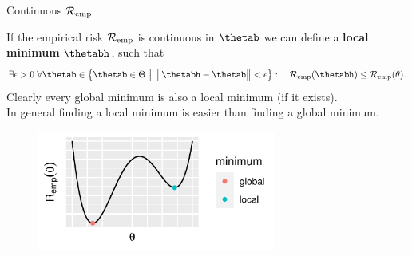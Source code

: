 \documentclass[11pt,compress,t,notes=noshow, xcolor=table]{beamer}
\begin{document}
\begin{vbframe}{Continuous $\mathcal{R}_{\text{emp}}$}

If the empirical risk $\mathcal{R}_{\text{emp}}$ is continuous in $\thetab$ we can define a \textbf{local minimum} $\thetabh$, such that
\[
\exists \epsilon > 0\; \forall \thetab \in \left\{\bar\thetab \in \Theta ~\big|~ \left\Vert\thetabh - \bar\thetab\right\Vert < \epsilon\right\}: \quad \riske(\thetabh) \leq \risket .
\]
Clearly every global minimum is also a local minimum (if it exists). \\
In general finding a local minimum is easier than finding a global minimum.

\begin{center}
\begin{figure}[!b]
\includegraphics[width=0.7\textwidth]{figure/g_l_min}
\end{figure}
\end{center}

\end{vbframe}
\end{document}
